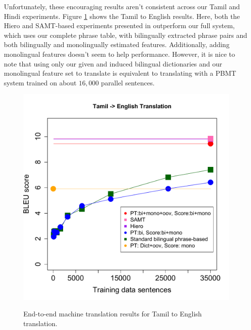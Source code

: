 \documentclass[11pt]{article}
\begin{document}
Unfortunately, these encouraging results aren't consistent across our Tamil and Hindi experiments. Figure \ref{fig:tatrans} shows the Tamil to English results. Here, both the Hiero and SAMT-based experiments presented in  outperform our full system, which uses our complete phrase table, with bilingually extracted phrase pairs and both bilingually and monolingually estimated features. Additionally, adding monolingual features doesn't seem to help performance. However, it is nice to note that using only our given and induced bilingual dictionaries and our monolingual feature set to translate is equivalent to translating with a PBMT system trained on about $16,000$ parallel sentences.

\begin{figure}
\vskip 0.0in
\begin{center}
\includegraphics[width=1.05 \linewidth]{Figures/tatranslate.pdf}
\vskip -0.15in
\caption{End-to-end machine translation results for Tamil to English translation.}
\vskip -0.2in
\label{fig:tatrans} 
\end{center}
\end{figure}

\newpage



\end{document}
